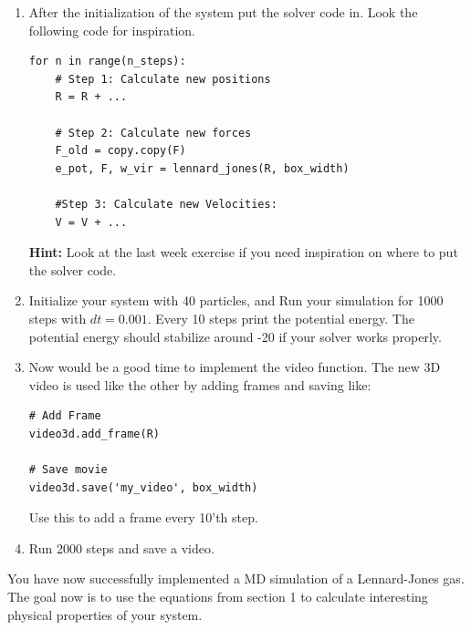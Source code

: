 \documentclass{article}
\begin{document}
\begin{enumerate}[resume]

    \item After the initialization of the system put the solver code in.
        Look the following code for inspiration.

\begin{lstlisting}
for n in range(n_steps):
    # Step 1: Calculate new positions
    R = R + ...

    # Step 2: Calculate new forces
    F_old = copy.copy(F)
    e_pot, F, w_vir = lennard_jones(R, box_width)

    #Step 3: Calculate new Velocities:
    V = V + ...
\end{lstlisting}

    {\bf Hint:} Look at the last week exercise if you need inspiration on where to put the solver code.

    \item Initialize your system with 40 particles,  and 
        Run your simulation for 1000 steps with $dt = 0.001$.
        Every 10 steps print the potential energy.
        The potential energy should stabilize around -20 if your solver works properly.

    \item Now would be a good time to implement the video function.
        The new 3D video is used like the other by adding frames and saving like:

\begin{lstlisting}
# Add Frame
video3d.add_frame(R)

# Save movie
video3d.save('my_video', box_width)

\end{lstlisting}

        Use this to add a frame every 10'th step.

    \item Run 2000 steps and save a video.

\end{enumerate}

You have now successfully implemented a MD simulation of a Lennard-Jones gas.
The goal now is to use the equations from section 1 to calculate interesting physical properties of your system.
\end{document}
